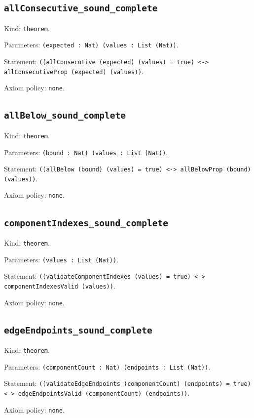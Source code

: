 \documentclass[11pt]{article}
\begin{document}
\subsection*{\texttt{allConsecutive\_sound\_complete}}
\noindent Kind: \texttt{theorem}.\par
\noindent Parameters: \texttt{(expected : Nat) (values : List (Nat))}.\par
\noindent Statement: \texttt{((allConsecutive (expected) (values) = true) <-> allConsecutiveProp (expected) (values))}.\par
\noindent Axiom policy: \texttt{none}.\par
\subsection*{\texttt{allBelow\_sound\_complete}}
\noindent Kind: \texttt{theorem}.\par
\noindent Parameters: \texttt{(bound : Nat) (values : List (Nat))}.\par
\noindent Statement: \texttt{((allBelow (bound) (values) = true) <-> allBelowProp (bound) (values))}.\par
\noindent Axiom policy: \texttt{none}.\par
\subsection*{\texttt{componentIndexes\_sound\_complete}}
\noindent Kind: \texttt{theorem}.\par
\noindent Parameters: \texttt{(values : List (Nat))}.\par
\noindent Statement: \texttt{((validateComponentIndexes (values) = true) <-> componentIndexesValid (values))}.\par
\noindent Axiom policy: \texttt{none}.\par
\subsection*{\texttt{edgeEndpoints\_sound\_complete}}
\noindent Kind: \texttt{theorem}.\par
\noindent Parameters: \texttt{(componentCount : Nat) (endpoints : List (Nat))}.\par
\noindent Statement: \texttt{((validateEdgeEndpoints (componentCount) (endpoints) = true) <-> edgeEndpointsValid (componentCount) (endpoints))}.\par
\noindent Axiom policy: \texttt{none}.\par
\end{document}
